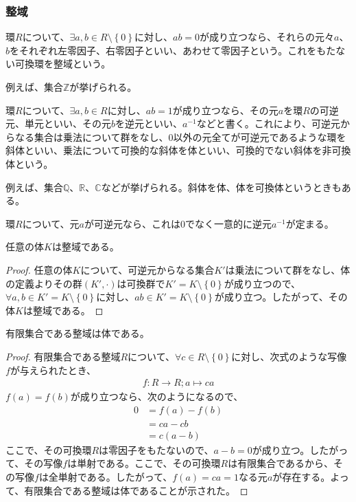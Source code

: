 \documentclass[dvipdfmx]{jsarticle}
\begin{document}
\subsubsection{整域}%
\begin{dfn}
環$R$について、$\exists a,b \in R \setminus \left\{ 0 \right\}$に対し、$ab = 0$が成り立つなら、それらの元々$a$、$b$をそれぞれ左零因子、右零因子といい、あわせて零因子という。これをもたない可換環を整域という。
\end{dfn}\par
例えば、集合$\mathbb{Z}$が挙げられる。
\begin{dfn}
環$R$について、$\exists a,b \in R$に対し、$ab = 1$が成り立つなら、その元$a$を環$R$の可逆元、単元といい、その元$b$を逆元といい、$a^{- 1}$などと書く。これにより、可逆元からなる集合は乗法について群をなし、$0$以外の元全てが可逆元であるような環を斜体といい、乗法について可換的な斜体を体といい、可換的でない斜体を非可換体という。
\end{dfn}\par
例えば、集合$\mathbb{Q}$、$\mathbb{R}$、$\mathbb{C}$などが挙げられる。斜体を体、体を可換体というときもある。
\begin{thm*}
環$R$について、元$a$が可逆元なら、これは$0$でなく一意的に逆元${a}^{-1}$が定まる。
\end{thm*}
\begin{thm}\label{3.3.1.12}
任意の体$K$は整域である。
\end{thm}
\begin{proof}
任意の体$K$について、可逆元からなる集合$K'$は乗法について群をなし、体の定義よりその群$\left( K', \cdot \right)$は可換群で$K' = K \setminus \left\{ 0 \right\}$が成り立つので、$\forall a,b \in K' = K \setminus \left\{ 0 \right\}$に対し、$ab \in K' = K \setminus \left\{ 0 \right\}$が成り立つ。したがって、その体$K$は整域である。
\end{proof}
\begin{thm}\label{3.3.1.13}
有限集合である整域は体である。
\end{thm}
\begin{proof}
有限集合である整域$R$について、$\forall c \in R \setminus \left\{ 0 \right\}$に対し、次式のような写像$f$が与えられたとき、
\begin{align*}
f:R \rightarrow R;a \mapsto ca
\end{align*}
$f(a) = f(b)$が成り立つなら、次のようになるので、
\begin{align*}
0 &= f(a) - f(b)\\
&= ca - cb\\
&= c(a - b)
\end{align*}
ここで、その可換環$R$は零因子をもたないので、$a - b = 0$が成り立つ。したがって、その写像$f$は単射である。ここで、その可換環$R$は有限集合であるから、その写像$f$は全単射である。したがって、$f(a) = ca = 1$なる元$a$が存在する。よって、有限集合である整域は体であることが示された。
\end{proof}
\end{document}
